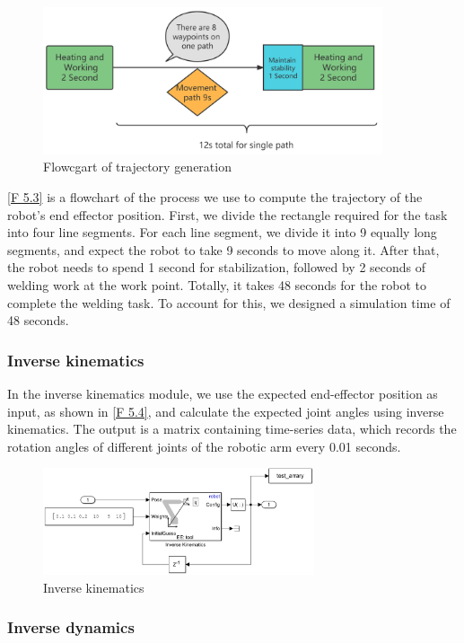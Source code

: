 \begin{figure}[htbp]
	\centering
	\includegraphics[width=10cm]{./fig/siwei.png}
	\caption{Flowcgart of trajectory generation }
	\label{F 5.3}
\end{figure}

\autoref{F 5.3} is a flowchart of the process we use to compute the trajectory of the robot's end effector position. First, we divide the rectangle required for the task into four line segments. For each line segment, we divide it into 9 equally long segments, and expect the robot to take 9 seconds to move along it. After that, the robot needs to spend 1 second for stabilization, followed by 2 seconds of welding work at the work point. Totally, it takes 48 seconds for the robot to complete the welding task. To account for this, we designed a simulation time of 48 seconds. 

\subsubsection*{Inverse kinematics}

In the inverse kinematics module, we use the expected end-effector position as input, as shown in \autoref{F 5.4}, and calculate the expected joint angles using inverse kinematics. The output is a matrix containing time-series data, which records the rotation angles of different joints of the robotic arm every 0.01 seconds.
\begin{figure}[htbp]
	\centering
	\includegraphics[width=8cm]{./fig/IK.png}
	\caption{Inverse kinematics}
	\label{F 5.4}
\end{figure}

\subsubsection*{Inverse dynamics}

